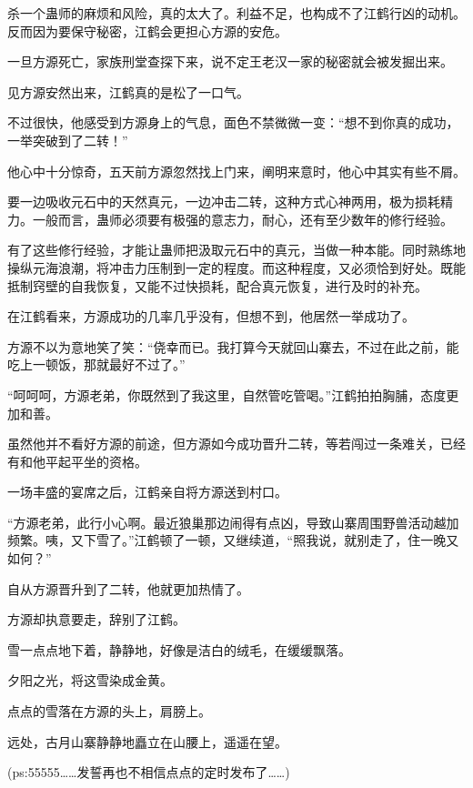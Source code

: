\begin{this_body}
杀一个蛊师的麻烦和风险，真的太大了。利益不足，也构成不了江鹤行凶的动机。反而因为要保守秘密，江鹤会更担心方源的安危。

一旦方源死亡，家族刑堂查探下来，说不定王老汉一家的秘密就会被发掘出来。

见方源安然出来，江鹤真的是松了一口气。

不过很快，他感受到方源身上的气息，面色不禁微微一变：“想不到你真的成功，一举突破到了二转！”

他心中十分惊奇，五天前方源忽然找上门来，阐明来意时，他心中其实有些不屑。

要一边吸收元石中的天然真元，一边冲击二转，这种方式心神两用，极为损耗精力。一般而言，蛊师必须要有极强的意志力，耐心，还有至少数年的修行经验。

有了这些修行经验，才能让蛊师把汲取元石中的真元，当做一种本能。同时熟练地操纵元海浪潮，将冲击力压制到一定的程度。而这种程度，又必须恰到好处。既能抵制窍壁的自我恢复，又能不过快损耗，配合真元恢复，进行及时的补充。

在江鹤看来，方源成功的几率几乎没有，但想不到，他居然一举成功了。

方源不以为意地笑了笑：“侥幸而已。我打算今天就回山寨去，不过在此之前，能吃上一顿饭，那就最好不过了。”

“呵呵呵，方源老弟，你既然到了我这里，自然管吃管喝。”江鹤拍拍胸脯，态度更加和善。

虽然他并不看好方源的前途，但方源如今成功晋升二转，等若闯过一条难关，已经有和他平起平坐的资格。

一场丰盛的宴席之后，江鹤亲自将方源送到村口。

“方源老弟，此行小心啊。最近狼巢那边闹得有点凶，导致山寨周围野兽活动越加频繁。咦，又下雪了。”江鹤顿了一顿，又继续道，“照我说，就别走了，住一晚又如何？”

自从方源晋升到了二转，他就更加热情了。

方源却执意要走，辞别了江鹤。

雪一点点地下着，静静地，好像是洁白的绒毛，在缓缓飘落。

夕阳之光，将这雪染成金黄。

点点的雪落在方源的头上，肩膀上。

远处，古月山寨静静地矗立在山腰上，遥遥在望。

(ps:55555……发誓再也不相信点点的定时发布了……)

\end{this_body}

